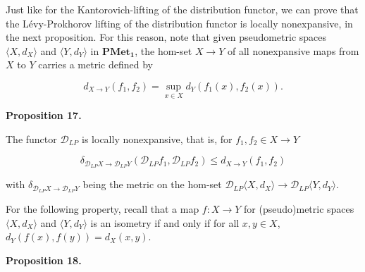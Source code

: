 \documentclass[10pt,a4paper]{article}
\begin{document}
 
 
Just like for the Kantorovich-lifting of the distribution functor, we can prove that the Lévy-Prokhorov lifting of the distribution functor is locally nonexpansive, in the next proposition. For this reason, note that given pseudometric spaces $\langle X,d_{X}\rangle$ and $\langle Y,d_{Y}\rangle$ in $\mathbf{PMet_{1}}$, the hom-set $X\to Y$ of all nonexpansive maps from $X$ to $Y$ carries a metric defined by\par
  
\par  \quad  \[d_{X\to Y}(f_{1},f_{2})=\sup_{x\in X}d_{Y}(f_{1}(x),f_{2}(x)).\]\quad  \quad  
  
 
 
\par\medskip\noindent\textbf{Proposition 17.}\par
 
 
The functor $\mathcal{D}_{LP}$ is locally nonexpansive, that is, for $f_{1},f_{2}\in X\to Y$\par
  
\par  \quad  \[\delta_{\mathcal{D}_{LP}X\to\mathcal{D}_{LP}Y}(\mathcal{D}_{LP}f_{1},\mathcal{D}_{LP}f_{2})\leq d_{X\to Y}(f_{1},f_{2})\]\quad  \quad  
  
with $\delta_{\mathcal{D}_{LP}X\to\mathcal{D}_{LP}Y}$ being the metric on the hom-set $\mathcal{D}_{LP}\langle X,d_{X}\rangle\to\mathcal{D}_{LP}\langle Y,d_{Y}\rangle$.\par
 
 
 
 
For the following property, recall that a map $f\colon X\to Y$ for (pseudo)metric spaces $\langle X,d_{X}\rangle$ and $\langle Y,d_{Y}\rangle$ is an isometry if and only if for all $x,y\in X$, $d_{Y}(f(x),f(y))=d_{X}(x,y)$.\par
 
 
 
\par\medskip\noindent\textbf{Proposition 18.}\par
 
\end{document}
